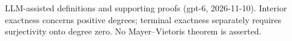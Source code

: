 \documentclass[11pt]{article}
\begin{document}

\bigskip
{\footnotesize LLM-assisted definitions and supporting proofs (gpt-6, 2026-11-10).
Interior exactness concerns positive degrees; terminal exactness separately requires surjectivity onto degree zero. No Mayer--Vietoris theorem is asserted.}
\end{document}
